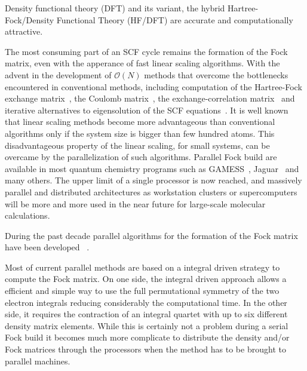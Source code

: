 \documentclass[prl,twocolumn,showpacs,twocolumngrid,superbib]{revtex4}
\begin{document}
 Density functional theory (DFT) and its variant, 
 the hybrid Hartree-Fock/Density Functional Theory (HF/DFT) are accurate and
 computationally attractive. 

 The most consuming part of an SCF cycle remains the formation
 of the Fock matrix, even with the apperance of fast linear
 scaling algorithms. 
 With the advent in the development of $\mathcal{O}(N)$ methods
 that overcome the bottlenecks encountered in conventional methods,
 including computation of the Hartree-Fock exchange 
 matrix~\cite{ESchwegler96,ESchwegler97,ESchwegler98A,ESchwegler99,ESchwegler00,CTymczak04b},
 the Coulomb 
 matrix~\cite{CWhite94B,CWhite96A,MChallacombe96,MChallacombe96B,MStrain96,
              JPerezjorda97,MChallacombe97,CTymczak04a}, 
 the exchange-correlation 
 matrix~\cite{CTymczak04a,Jorda95,RStratmann96,CGuerra98,MChallacombe00A}
 and iterative alternatives to eigensolution of the SCF 
 equations~\cite{XLi93,MDaw93,ADaniels97,APalser98,
                 MChallacombe99,ANiklasson02A,ANiklasson03}.
 It is well known that linear scaling 
 methods become more advantageous than conventional  
 algorithms only if the system size is bigger than
 few hundred atoms. This disadvantageous property of the linear
 scaling, for small systems, can be overcame by the
 parallelization of such algorithms. 
 Parallel Fock build are available in most quantum
 chemistry programs such as GAMESS~\cite{GAMESS},
 Jaguar~\cite{DChasman98} and many others. 
 The upper limit of a single processor
 is now reached, and massively parallel and distributed
 architectures as workstation clusters or supercomputers will be 
 more and more used in the near future for large-scale 
 molecular calculations.


 During the past decade parallel algorithms for the 
 formation of the Fock matrix have been developed
 ~\cite{MColvin93,TFurlani95,RHarrison96,HTakashima02}.


 Most of current parallel methods are based on a integral driven strategy
 to compute the Fock matrix. On one side, the integral driven approach
 allows a efficient and simple way to use the full permutational symmetry
 of the two electron integrals reducing considerably the computational time. 
 In the other side, it requires the contraction of an integral quartet with up to six 
 different density matrix elements.
 While this is certainly not a problem during a serial Fock build it becomes
 much more complicate to distribute the density and/or Fock matrices through the 
 processors when the method has to be brought to parallel machines.
\end{document}
